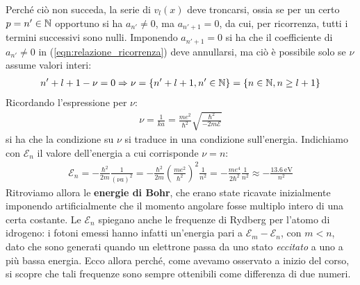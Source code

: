 \documentclass[../../FisicaTeorica.tex]{subfiles}
\begin{document}
Perché ciò non succeda, la serie di $v_l(x)$ deve troncarsi, ossia se per un certo $p = n' \in \mathbb{N}$ opportuno si ha $a_{n'}\neq 0$, ma $a_{n' +1}=0$, da cui, per ricorrenza, tutti i termini successivi sono nulli. Imponendo $a_{n'+1}=0$ si ha che il coefficiente di $a_{n'}\neq 0$ in (\ref{eqn:relazione_ricorrenza}) deve annullarsi, ma ciò è possibile solo se $\nu$ assume valori interi:
\begin{align*}
n' + l +1 -\nu=0 \Rightarrow \nu = \{n' + l +1, n' \in \mathbb{N}\} = \{n\in \mathbb{N}, n\geq l+1\}
\end{align*}
Ricordando l'espressione per $\nu$:
\begin{align*}
\nu = \frac{1}{ka}=\frac{me^2}{\hbar^2} \sqrt{\frac{\hbar^2}{-2m\mathcal{E}}}
\end{align*}
si ha che la condizione su $\nu$ si traduce in una condizione sull'energia. Indichiamo con $\mathcal{E}_n$ il valore dell'energia a cui corrisponde $\nu = n$:
\begin{align}
\mathcal{E}_n = -\frac{\hbar^2}{2m}\frac{1}{(\nu a)^2} = -\frac{\hbar^2}{2m}\left(\frac{me^2}{\hbar^2}\right)^2 \frac{1}{n^2} = -\frac{me^4}{2\hbar^2}\frac{1}{n^2} \approx -\frac{\SI{13.6}{\electronvolt}}{n^2}
\label{eqn:bohr_energy}
\end{align}
Ritroviamo allora le \textbf{energie di Bohr}, che erano state ricavate inizialmente imponendo artificialmente che il momento angolare fosse multiplo intero di una certa costante. Le $\mathcal{E}_n$ spiegano anche le frequenze di Rydberg per l'atomo di idrogeno: i fotoni emessi hanno infatti un'energia pari a $\mathcal{E}_m-\mathcal{E}_n$, con $m<n$, dato che sono generati quando un elettrone passa da uno stato \textit{eccitato} a uno a più bassa energia. Ecco allora perché, come avevamo osservato a inizio del corso, si scopre che tali frequenze sono sempre ottenibili come differenza di due numeri.\\
\end{document}
